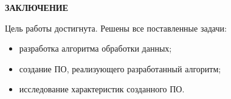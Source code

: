\begin{center}
    \textbf{ЗАКЛЮЧЕНИЕ}
\end{center}

Цель работы достигнута. Решены все поставленные задачи:
\begin{itemize}
    \item разработка алгоритма обработки данных;
    \item создание ПО, реализующего разработанный алгоритм;
    \item исследование характеристик созданного ПО.
\end{itemize}




